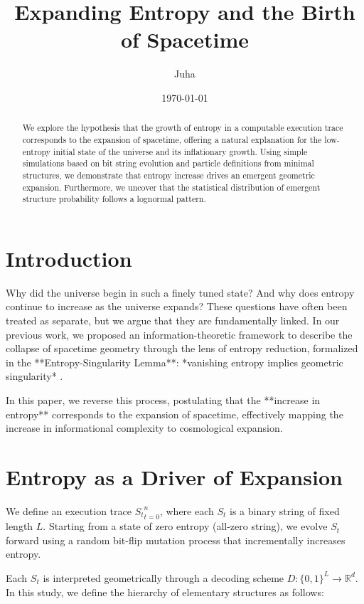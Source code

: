 \documentclass[11pt]{article}
\title{Expanding Entropy and the Birth of Spacetime}
\author{Juha}
\date{\today}
\begin{document}
\maketitle


\begin{abstract}
   We explore the hypothesis that the growth of entropy in a computable execution trace corresponds to the expansion of spacetime,
   offering a natural explanation for the low-entropy initial state of the universe and its inflationary growth. Using simple simulations
   based on bit string evolution and particle definitions from minimal structures, we demonstrate that entropy
   increase drives an emergent geometric expansion. Furthermore, we uncover that the statistical distribution of emergent
   structure probability follows a lognormal pattern.
\end{abstract}

\section{Introduction}

Why did the universe begin in such a finely tuned state? And why does entropy continue to increase as the universe expands?
These questions have often been treated as separate, but we argue that they are fundamentally linked.
In our previous work, we proposed an information-theoretic framework to describe the collapse of spacetime geometry through
the lens of entropy reduction, formalized in the **Entropy-Singularity Lemma**: *vanishing entropy implies geometric
singularity* \cite{Paper1}.

In this paper, we reverse this process, postulating that the **increase in entropy** corresponds to the expansion of spacetime,
effectively mapping the increase in informational complexity to cosmological expansion.


\section{Entropy as a Driver of Expansion}

We define an execution trace ${S_t}_{t=0}^n$, where each $S_t$ is a binary string of fixed length $L$.
Starting from a state of zero entropy (all-zero string), we evolve $S_t$ forward using a random bit-flip mutation process that
incrementally increases entropy.

Each $S_t$ is interpreted geometrically through a decoding scheme $D: \{0,1\}^L \to \mathbb{R}^d$. In this study,
we define the hierarchy of elementary structures as follows:
\end{document}
